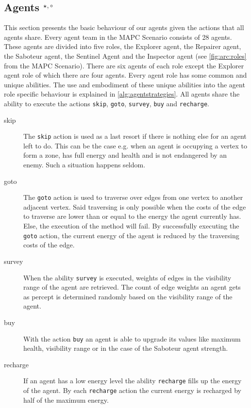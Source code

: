 \subsection[Agents]{Agents $^{\star,\circ}$}\label{arc:agents}
This section presents the basic behaviour of our agents given the actions that all agents share.
Every agent team in the MAPC Scenario consists of 28 agents.
These agents are divided into five roles, the Explorer agent, the Repairer agent, the Saboteur agent, the Sentinel Agent and the Inspector agent (see \autoref{fig:arc:roles} from the MAPC Scenario).
There are six agents of each role except the Explorer agent role of which there are four agents.
Every agent role has some common and unique abilities.
The use and embodiment of these unique abilities into the agent role specific behaviour is explained in \autoref{alg:agentstrategies}.
All agents share the ability to execute the actions \texttt{skip}, \texttt{goto}, \texttt{survey}, \texttt{buy} and \texttt{recharge}.
\begin{description}
   \item[skip] The \texttt{skip} action is used as a last resort if there is nothing else for an agent left to do.
               This can be the case e.g. when an agent is occupying a vertex to form a zone, has full energy and health and is not endangered by an enemy.
               Such a situation happens seldom.
   \item[goto] The \texttt{goto} action is used to traverse over edges from one vertex to another adjacent vertex.
               Said traversing is only possible when the costs of the edge to traverse are lower than or equal to the energy the agent currently has.
               Else, the execution of the method will fail.
               By successfully executing the \texttt{goto} action, the current energy of the agent is reduced by the traversing costs of the edge.
   \item[survey] When the ability \texttt{survey} is executed, weights of edges in the visibility range of the agent are retrieved.
                 The count of edge weights an agent gets as percept is determined randomly based on the visibility range of the agent.
   \item[buy] With the action \texttt{buy} an agent is able to upgrade its values like maximum health, visibility range or in the case of the Saboteur agent strength.
   \item[recharge] If an agent has a low energy level the ability \texttt{recharge} fills up the energy of the agent.
                   By each \texttt{recharge} action the current energy is recharged by half of the maximum energy.
\end{description}

